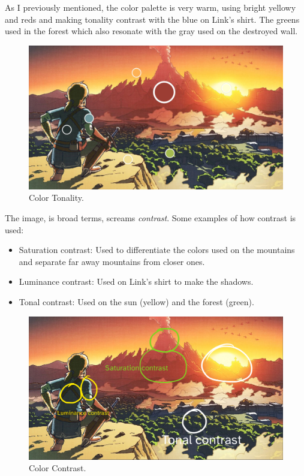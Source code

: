 \documentclass{cup-pan}
\begin{document}
            As I previously mentioned, the color palette is very warm, using bright yellowy and reds and making tonality contrast with the blue on Link's shirt.
            The greens used in the forest which also resonate with the gray used on the destroyed wall. \\
            \begin{figure}[H]
                \includegraphics[width=\textwidth]{Imagenes/Referencias/Analisis_ConceptArt/tonalidad.png}
                \caption{Color Tonality.}
            \end{figure}

            The image, is broad terms, screams \textit{contrast}. Some examples of how contrast is used:
            \begin{itemize}
                \item Saturation contrast: Used to differentiate the colors used on the mountains and separate far away mountains from closer ones.
                \item Luminance contrast: Used on Link's shirt to make the shadows. 
                \item Tonal contrast: Used on the sun (yellow) and the forest (green). 
            \end{itemize}
            \begin{figure}[H]
                \includegraphics[width=\textwidth]{Imagenes/Referencias/Analisis_ConceptArt/contrast.png}
                \caption{Color Contrast.}
            \end{figure}
\end{document}
